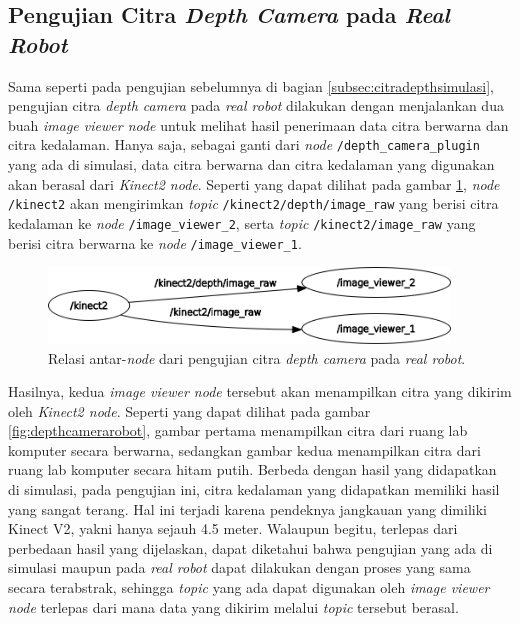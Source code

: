 \subsection{Pengujian Citra \emph{Depth Camera} pada \emph{Real Robot}}
\label{subsec:citradepthrobot}

Sama seperti pada pengujian sebelumnya di bagian \ref{subsec:citradepthsimulasi},
  pengujian citra \emph{depth camera} pada \emph{real robot} dilakukan dengan menjalankan dua buah \emph{image viewer node} untuk melihat hasil penerimaan data citra berwarna dan citra kedalaman.
Hanya saja, sebagai ganti dari \emph{node} \lstinline{/depth_camera_plugin} yang ada di simulasi,
  data citra berwarna dan citra kedalaman yang digunakan akan berasal dari \emph{Kinect2 node}.
Seperti yang dapat dilihat pada gambar \ref{fig:rosgraphdepthcamera},
  \emph{node} \lstinline{/kinect2} akan mengirimkan \emph{topic} \lstinline{/kinect2/depth/image_raw} yang berisi citra kedalaman ke \emph{node} \lstinline{/image_viewer_2},
  serta \emph{topic} \lstinline{/kinect2/image_raw} yang berisi citra berwarna ke \emph{node} \lstinline{/image_viewer_1}.

\begin{figure}[ht]
  \centering
  \includegraphics[width=0.95\textwidth,keepaspectratio]{gambar/rosgraph-depth-camera.png}
  \caption{Relasi antar-\emph{node} dari pengujian citra \emph{depth camera} pada \emph{real robot}.}
  \label{fig:rosgraphdepthcamera}
\end{figure}

Hasilnya, kedua \emph{image viewer node} tersebut akan menampilkan citra yang dikirim oleh \emph{Kinect2 node}.
Seperti yang dapat dilihat pada gambar \ref{fig:depthcamerarobot},
  gambar pertama menampilkan citra dari ruang lab komputer secara berwarna,
  sedangkan gambar kedua menampilkan citra dari ruang lab komputer secara hitam putih.
Berbeda dengan hasil yang didapatkan di simulasi, pada pengujian ini,
  citra kedalaman yang didapatkan memiliki hasil yang sangat terang.
Hal ini terjadi karena pendeknya jangkauan yang dimiliki Kinect V2, yakni hanya sejauh 4.5 meter.
Walaupun begitu, terlepas dari perbedaan hasil yang dijelaskan,
  dapat diketahui bahwa pengujian yang ada di simulasi maupun pada \emph{real robot} dapat dilakukan dengan proses yang sama secara terabstrak,
  sehingga \emph{topic} yang ada dapat digunakan oleh \emph{image viewer node} terlepas dari mana data yang dikirim melalui \emph{topic} tersebut berasal.

